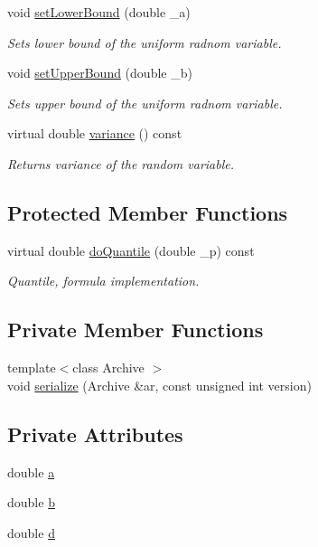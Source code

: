 \begin{DoxyCompactItemize}
void \hyperlink{class_c_uniform_c_r_v_a4dfdc2f1cdfe71249037d8973cc64d26}{set\-Lower\-Bound} (double \-\_\-a)
\begin{DoxyCompactList}\small\item\em Sets lower bound of the uniform radnom variable. \end{DoxyCompactList}\item 
void \hyperlink{class_c_uniform_c_r_v_a8c812e82ae9ac97d76c10a726c513877}{set\-Upper\-Bound} (double \-\_\-b)
\begin{DoxyCompactList}\small\item\em Sets upper bound of the uniform radnom variable. \end{DoxyCompactList}\item 
virtual double \hyperlink{class_c_uniform_c_r_v_ae172813a49f36b18e2ca1b8ba6e0654b}{variance} () const 
\begin{DoxyCompactList}\small\item\em Returns variance of the random variable. \end{DoxyCompactList}\end{DoxyCompactItemize}
\subsection*{Protected Member Functions}
\begin{DoxyCompactItemize}
\item 
virtual double \hyperlink{class_c_uniform_c_r_v_a7772dc9a0bb0f5fde808b1a1c4abd644}{do\-Quantile} (double \-\_\-p) const 
\begin{DoxyCompactList}\small\item\em Quantile, formula implementation. \end{DoxyCompactList}\end{DoxyCompactItemize}
\subsection*{Private Member Functions}
\begin{DoxyCompactItemize}
\item 
{\footnotesize template$<$class Archive $>$ }\\void \hyperlink{class_c_uniform_c_r_v_a8907e3953751caa6956b8be96d3173c2}{serialize} (Archive \&ar, const unsigned int version)
\end{DoxyCompactItemize}
\subsection*{Private Attributes}
\begin{DoxyCompactItemize}
\item 
double \hyperlink{class_c_uniform_c_r_v_abcc7651c5907899757ee7592f1b90dd5}{a}
\item 
double \hyperlink{class_c_uniform_c_r_v_a4c69f8949967ace20ce17ff7de02c3ce}{b}
\item 
double \hyperlink{class_c_uniform_c_r_v_adde06715632afa035ab41a9f090e0305}{d}
\end{DoxyCompactItemize}
